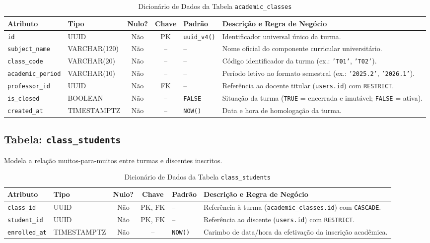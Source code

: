 \begin{table}[!ht]
\centering
\caption{Dicionário de Dados da Tabela \texttt{academic\_classes}}
\label{tab_dic_academic_classes}
\footnotesize
\begin{tabularx}{\textwidth}{p{3.2cm} p{2.5cm} c c p{1.8cm} X}
\toprule
\textbf{Atributo} & \textbf{Tipo} & \textbf{Nulo?} & \textbf{Chave} & \textbf{Padrão} & \textbf{Descrição e Regra de Negócio} \\
\midrule
\texttt{id} & UUID & Não & PK & \texttt{uuid\_v4()} & Identificador universal único da turma. \\
\texttt{subject\_name} & VARCHAR(120) & Não & -- & -- & Nome oficial do componente curricular universitário. \\
\texttt{class\_code} & VARCHAR(20) & Não & -- & -- & Código identificador da turma (ex.: \texttt{'T01'}, \texttt{'T02'}). \\
\texttt{academic\_period} & VARCHAR(10) & Não & -- & -- & Período letivo no formato semestral (ex.: \texttt{'2025.2'}, \texttt{'2026.1'}). \\
\texttt{professor\_id} & UUID & Não & FK & -- & Referência ao docente titular (\texttt{users.id}) com \texttt{RESTRICT}. \\
\texttt{is\_closed} & BOOLEAN & Não & -- & \texttt{FALSE} & Situação da turma (\texttt{TRUE} = encerrada e imutável; \texttt{FALSE} = ativa). \\
\texttt{created\_at} & TIMESTAMPTZ & Não & -- & \texttt{NOW()} & Data e hora de homologação da turma. \\
\bottomrule
\end{tabularx}
\end{table}

\subsection{Tabela: \texttt{class\_students}}
Modela a relação muitos-para-muitos entre turmas e discentes inscritos.

\begin{table}[!ht]
\centering
\caption{Dicionário de Dados da Tabela \texttt{class\_students}}
\label{tab_dic_class_students}
\footnotesize
\begin{tabularx}{\textwidth}{p{3.2cm} p{2.5cm} c c p{1.8cm} X}
\toprule
\textbf{Atributo} & \textbf{Tipo} & \textbf{Nulo?} & \textbf{Chave} & \textbf{Padrão} & \textbf{Descrição e Regra de Negócio} \\
\midrule
\texttt{class\_id} & UUID & Não & PK, FK & -- & Referência à turma (\texttt{academic\_classes.id}) com \texttt{CASCADE}. \\
\texttt{student\_id} & UUID & Não & PK, FK & -- & Referência ao discente (\texttt{users.id}) com \texttt{RESTRICT}. \\
\texttt{enrolled\_at} & TIMESTAMPTZ & Não & -- & \texttt{NOW()} & Carimbo de data/hora da efetivação da inscrição acadêmica. \\
\bottomrule
\end{tabularx}
\end{table}

